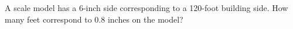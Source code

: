A scale model has a 6-inch side corresponding to a 120-foot building side. How many feet correspond to 0.8 inches on the model?
